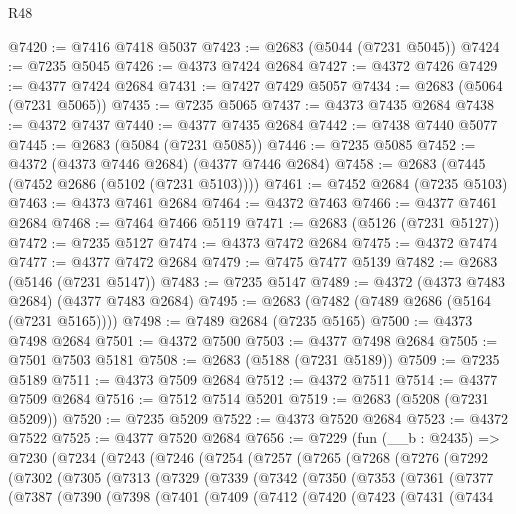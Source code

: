 \begin{lexlean}{R48}
\begin{coremodule}
@7420 := @7416 @7418 @5037
@7423 := @2683 (@5044 (@7231 @5045))
@7424 := @7235 @5045
@7426 := @4373 @7424 @2684
@7427 := @4372 @7426
@7429 := @4377 @7424 @2684
@7431 := @7427 @7429 @5057
@7434 := @2683 (@5064 (@7231 @5065))
@7435 := @7235 @5065
@7437 := @4373 @7435 @2684
@7438 := @4372 @7437
@7440 := @4377 @7435 @2684
@7442 := @7438 @7440 @5077
@7445 := @2683 (@5084 (@7231 @5085))
@7446 := @7235 @5085
@7452 := @4372 (@4373 @7446 @2684) (@4377 @7446 @2684)
@7458 := @2683 (@7445 (@7452 @2686 (@5102 (@7231 @5103))))
@7461 := @7452 @2684 (@7235 @5103)
@7463 := @4373 @7461 @2684
@7464 := @4372 @7463
@7466 := @4377 @7461 @2684
@7468 := @7464 @7466 @5119
@7471 := @2683 (@5126 (@7231 @5127))
@7472 := @7235 @5127
@7474 := @4373 @7472 @2684
@7475 := @4372 @7474
@7477 := @4377 @7472 @2684
@7479 := @7475 @7477 @5139
@7482 := @2683 (@5146 (@7231 @5147))
@7483 := @7235 @5147
@7489 := @4372 (@4373 @7483 @2684) (@4377 @7483 @2684)
@7495 := @2683 (@7482 (@7489 @2686 (@5164 (@7231 @5165))))
@7498 := @7489 @2684 (@7235 @5165)
@7500 := @4373 @7498 @2684
@7501 := @4372 @7500
@7503 := @4377 @7498 @2684
@7505 := @7501 @7503 @5181
@7508 := @2683 (@5188 (@7231 @5189))
@7509 := @7235 @5189
@7511 := @4373 @7509 @2684
@7512 := @4372 @7511
@7514 := @4377 @7509 @2684
@7516 := @7512 @7514 @5201
@7519 := @2683 (@5208 (@7231 @5209))
@7520 := @7235 @5209
@7522 := @4373 @7520 @2684
@7523 := @4372 @7522
@7525 := @4377 @7520 @2684
@7656 := @7229
    (fun (__b : @2435) =>
    @7230
      (@7234
        (@7243
          (@7246
            (@7254
              (@7257
                (@7265
                  (@7268
                    (@7276
                      (@7292
                        (@7302
                          (@7305
                            (@7313
                              (@7329
                                (@7339
                                  (@7342
                                    (@7350
                                      (@7353
                                        (@7361
                                          (@7377
                                            (@7387
                                              (@7390
                                                (@7398
                                                  (@7401
                                                    (@7409
                                                      (@7412
                                                        (@7420
                                                          (@7423
                                                            (@7431
                                                              (@7434

\end{coremodule}
\end{lexlean}
